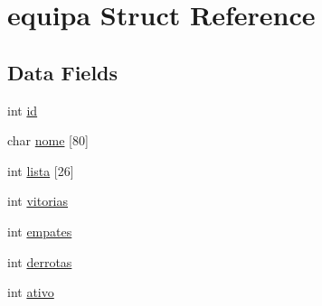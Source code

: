\hypertarget{structequipa}{\section{equipa \-Struct \-Reference}
\label{structequipa}
}
\subsection*{\-Data \-Fields}
\begin{DoxyCompactItemize}
\item 
int \hyperlink{structequipa_a7441ef0865bcb3db9b8064dd7375c1ea}{id}
\item 
char \hyperlink{structequipa_a2fe8d29936547b4ede632f419ea32367}{nome} \mbox{[}80\mbox{]}
\item 
int \hyperlink{structequipa_ae4169594b69b603d4d756c4b127b58ec}{lista} \mbox{[}26\mbox{]}
\item 
int \hyperlink{structequipa_a1fe4593c9060bf2d8f69a78b9af1f60b}{vitorias}
\item 
int \hyperlink{structequipa_a4ea65a038afceee592fe0b4a9eeebf98}{empates}
\item 
int \hyperlink{structequipa_aec0b9c1802275e055b4245b4d74e6733}{derrotas}
\item 
int \hyperlink{structequipa_a5bc3bc4334890083c1af35103dae7964}{ativo}
\end{DoxyCompactItemize}



